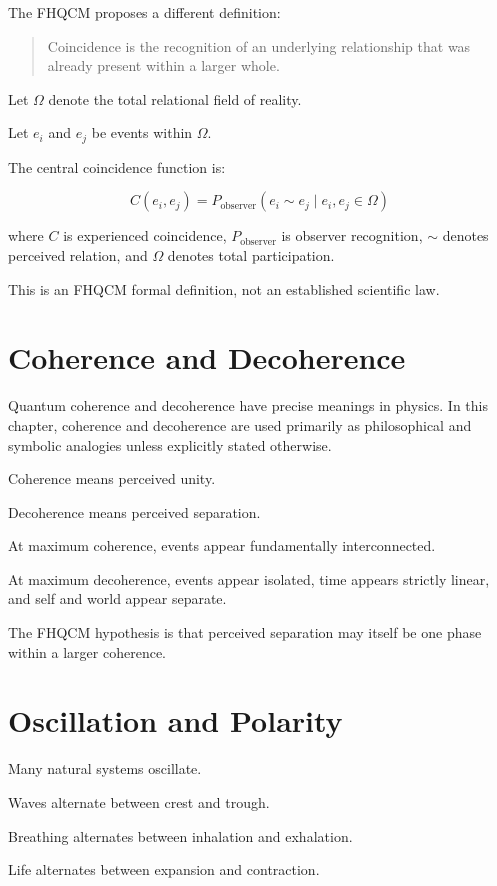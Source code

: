 The FHQCM proposes a different definition:

\begin{quote}
Coincidence is the recognition of an underlying relationship that was already present within a larger whole.
\end{quote}

Let $\Omega$ denote the total relational field of reality.

Let $e_i$ and $e_j$ be events within $\Omega$.

The central coincidence function is:

\[
C(e_i,e_j)=P_{\text{observer}}(e_i \sim e_j \mid e_i,e_j \in \Omega)
\]

where $C$ is experienced coincidence, $P_{\text{observer}}$ is observer recognition, $\sim$ denotes perceived relation, and $\Omega$ denotes total participation.

This is an FHQCM formal definition, not an established scientific law.

\section{Coherence and Decoherence}

Quantum coherence and decoherence have precise meanings in physics. In this chapter, coherence and decoherence are used primarily as philosophical and symbolic analogies unless explicitly stated otherwise.

Coherence means perceived unity.

Decoherence means perceived separation.

At maximum coherence, events appear fundamentally interconnected.

At maximum decoherence, events appear isolated, time appears strictly linear, and self and world appear separate.

The FHQCM hypothesis is that perceived separation may itself be one phase within a larger coherence.

\section{Oscillation and Polarity}

Many natural systems oscillate.

Waves alternate between crest and trough.

Breathing alternates between inhalation and exhalation.

Life alternates between expansion and contraction.

